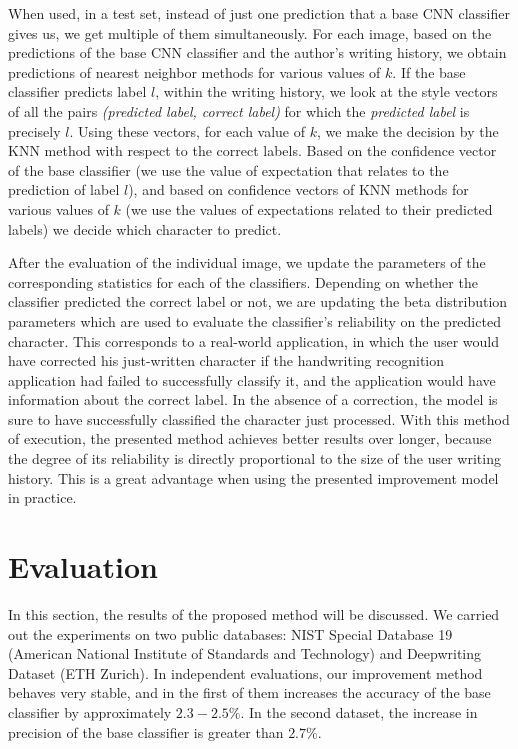 \documentclass{article}
\begin{document}
When used, in a test set, instead of just one prediction that a base CNN classifier gives us, we get multiple of them simultaneously.
For each image, based on the predictions of the base CNN classifier and the author's writing history, we obtain predictions of nearest neighbor methods for various values of $k$.
If the base classifier predicts label $l$, within the writing history, we look at the style vectors of all the pairs \textit{(predicted label, correct label)} for which the \textit{predicted label} is precisely $l$.
Using these vectors, for each value of $k$, we make the decision by the KNN method with respect to the correct labels.
Based on the confidence vector of the base classifier (we use the value of expectation that relates to the prediction of label $l$), and based on confidence vectors of KNN methods for various values of $k$
(we use the values of expectations related to their predicted labels) we decide which character to predict.

After the evaluation of the individual image, we update the parameters of the corresponding statistics for each of the classifiers.
Depending on whether the classifier predicted the correct label or not, we are updating the beta distribution parameters which are used to evaluate the classifier's reliability on the predicted character.
This corresponds to a real-world application, in which the user would have corrected his just-written character if the handwriting recognition application had failed to successfully classify it,
and the application would have information about the correct label.
In the absence of a correction, the model is sure to have successfully classified the character just processed.
With this method of execution, the presented method achieves better results over longer, because the degree of its reliability is directly proportional to the size of the user writing history.
This is a great advantage when using the presented improvement model in practice.

\section{Evaluation}

In this section, the results of the proposed method will be discussed.
We carried out the experiments on two public databases: NIST Special Database 19 (American National Institute of Standards and Technology) and
Deepwriting Dataset (ETH Zurich). %
In independent evaluations, our improvement method behaves very stable, and in the first of them increases the accuracy of the base classifier by approximately $2.3-2.5\%$.
In the second dataset, the increase in precision of the base classifier is greater than $2.7\%$.
\end{document}
